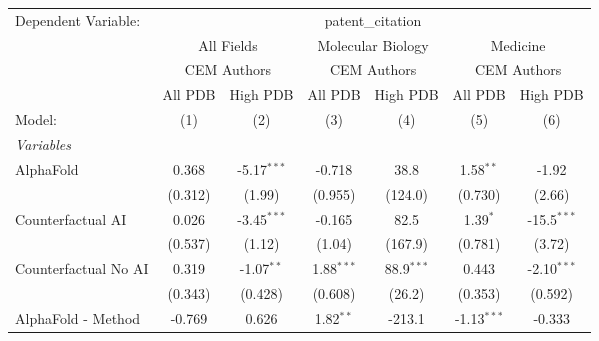 \begingroup
\centering
\begin{tabular}{lcccccc}
   \tabularnewline \midrule \midrule
   Dependent Variable: & \multicolumn{6}{c}{patent\_citation}\\
 & \multicolumn{2}{c}{All Fields} & \multicolumn{2}{c}{Molecular Biology} & \multicolumn{2}{c}{Medicine} \\
\cmidrule(lr){2-3} \cmidrule(lr){4-5} \cmidrule(lr){6-7}
 & \multicolumn{2}{c}{CEM Authors} & \multicolumn{2}{c}{CEM Authors} & \multicolumn{2}{c}{CEM Authors} \\
\cmidrule(lr){2-3} \cmidrule(lr){4-5} \cmidrule(lr){6-7}
 & \multicolumn{1}{c}{All PDB} & \multicolumn{1}{c}{High PDB} & \multicolumn{1}{c}{All PDB} & \multicolumn{1}{c}{High PDB} & \multicolumn{1}{c}{All PDB} & \multicolumn{1}{c}{High PDB} \\
\cmidrule(lr){2-2} \cmidrule(lr){3-3} \cmidrule(lr){4-4} \cmidrule(lr){5-5} \cmidrule(lr){6-6} \cmidrule(lr){7-7}
   Model:                                                     & (1)           & (2)           & (3)           & (4)          & (5)           & (6)\\  
   \midrule
   \emph{Variables}\\
   AlphaFold                                                  & 0.368         & -5.17$^{***}$ & -0.718        & 38.8         & 1.58$^{**}$   & -1.92\\   
                                                              & (0.312)       & (1.99)        & (0.955)       & (124.0)      & (0.730)       & (2.66)\\   
   Counterfactual AI                                          & 0.026         & -3.45$^{***}$ & -0.165        & 82.5         & 1.39$^{*}$    & -15.5$^{***}$\\   
                                                              & (0.537)       & (1.12)        & (1.04)        & (167.9)      & (0.781)       & (3.72)\\   
   Counterfactual No AI                                       & 0.319         & -1.07$^{**}$  & 1.88$^{***}$  & 88.9$^{***}$ & 0.443         & -2.10$^{***}$\\   
                                                              & (0.343)       & (0.428)       & (0.608)       & (26.2)       & (0.353)       & (0.592)\\   
   AlphaFold - Method                                         & -0.769        & 0.626         & 1.82$^{**}$   & -213.1       & -1.13$^{***}$ & -0.333\\   

\end{tabular}
